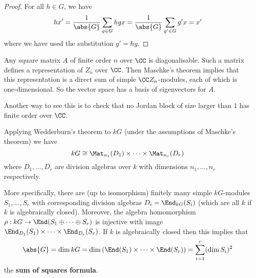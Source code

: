 \begin{proof}
	For all $h \in G$, we have
	\[hx' = \frac 1{\abs{G}} \sum_{g \in G} hgx = \frac 1{\abs{G}} \sum_{g' \in G} g'x = x'\]
	where we have used the substitution $g'=hg$.
\end{proof}

\begin{cor}
	\leavevmode
	\begin{enum}
		\io
		Any square matrix $A$ of finite order $n$ over $\CC$ is diagonalisable.
		Such a matrix defines a representation of $Z_n$ over $\CC$.
		Then Maschke's theorem implies that this representation is a direct sum of simple $\CC Z_n$-modules, each of which is one-dimensional.
		So the vector space has a basis of eigenvectors for $A$.
		
		Another way to see this is to check that no Jordan block of size larger than $1$ has finite order over $\CC$.
		
		\io
		Applying Wedderburn's theorem to $kG$ (under the assumptions of Maschke's theorem) we have
		\[kG \cong \Mat_{n_1}(D_1) \times \cdots \times \Mat_{n_r}(D_r)\]
		where $D_1,\ldots,D_r$ are division algebras over $k$ with dimensions $n_1,\ldots,n_r$ respectively.
		
		More specifically, there are (up to isomorphism) finitely many simple $kG$-modules $S_1,\ldots,S_r$ with corresponding division algebras $D_i=\End_{kG}(S_i)$ (which are all $k$ if $k$ is algebraically closed).
		Moreover, the algebra homomorphism $\rho: kG \to \End(S_1\oplus\cdots\oplus S_r)$ is injective with image $\End_{D_1}(S_1)\times\cdots\times\End_{D_r}(S_r)$.
		If $k$ is algebraically closed then this implies that
		\[\abs{G} = \dim kG = \dim\left(\End(S_1)\times\cdots\times\End(S_r)\right) = \sum_{i=1}^r (\dim S_i)^2\]
		the \textbf{sum of squares formula}.
	\end{enum}
\end{cor}

